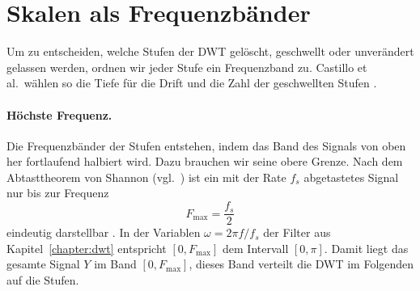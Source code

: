 \documentclass[a4paper,11pt,bibliography=totoc,listof=totoc,headinclude=true,cleardoublepage=empty,oneside]{scrbook}
\theoremstyle{plain}
\theoremstyle{definition}
\begin{document}
\section{Skalen als Frequenzbänder}
\label{sec:frequenzbaender}

Um zu entscheiden, welche Stufen der DWT gelöscht, geschwellt oder
unverändert gelassen werden, ordnen wir jeder Stufe ein Frequenzband zu.
Castillo et al.\ wählen so die Tiefe für die Drift und die Zahl der
geschwellten Stufen \cite[Abschn.~3.1.2, 3.1.3]{castillo}. %

\paragraph{Höchste Frequenz.}
Die Frequenzbänder der Stufen entstehen, indem das Band des Signals von oben
her fortlaufend halbiert wird. Dazu brauchen wir seine obere Grenze. Nach dem Abtasttheorem von Shannon
(vgl.\ \cite[Kap.~2.4, Satz (2.16)]{blatter}) %
ist ein mit der Rate $f_s$ abgetastetes Signal nur bis zur Frequenz
\[
  F_{\max} = \frac{f_s}{2}
\]
eindeutig darstellbar \cite[Abschn.~3.1.2]{castillo}. %
In der Variablen $\omega = 2\pi f/f_s$ der Filter aus
Kapitel~\ref{chapter:dwt} entspricht $[0,F_{\max}]$ dem Intervall $[0,\pi]$.
Damit liegt das gesamte Signal $Y$ im Band $[0,F_{\max}]$, dieses Band
verteilt die DWT im Folgenden auf die Stufen.
\end{document}
